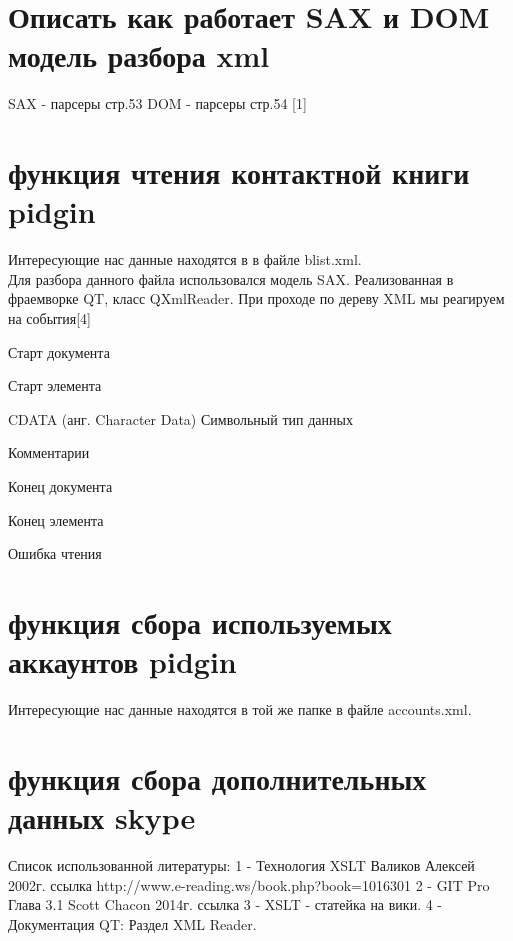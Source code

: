 \chapter*{Описать как работает SAX и DOM модель разбора xml}

SAX - парсеры стр.53
DOM - парсеры стр.54
[1]%
\chapter*{функция чтения контактной книги pidgin}
Интересующие нас данные находятся в %
в файле blist.xml.
\\Для разбора данного файла использовался модель SAX. Реализованная в фраемворке QT, класс QXmlReader. При проходе по дереву XML мы реагируем на события[4]
\item Старт документа
\item Старт элемента
\item CDATA (анг. Character Data) Символьный тип данных
\item Комментарии
\item Конец документа
\item Конец элемента
\item Ошибка чтения
\chapter*{функция сбора используемых аккаунтов pidgin}
Интересующие нас данные находятся в той же папке %
в файле accounts.xml.
\chapter*{функция сбора дополнительных данных skype}
Список использованной литературы:
1 -  Технология XSLT Валиков Алексей 2002г. ссылка http://www.e-reading.ws/book.php?book=1016301
2 -  GIT Pro Глава 3.1 Scott Chacon 2014г. ссылка 
3 -  XSLT - статейка на вики.
4 -  Документация QT: Раздел XML Reader.
